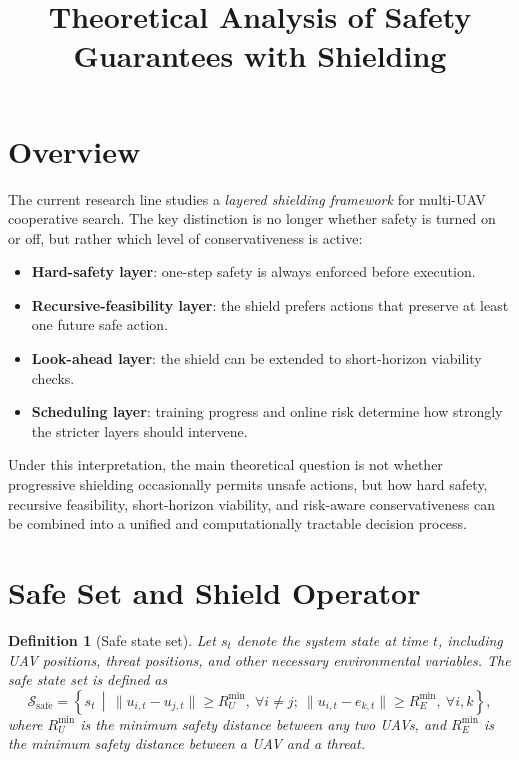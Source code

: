 \documentclass[11pt]{article}
\title{Theoretical Analysis of Safety Guarantees with Shielding}
\author{}
\date{}
\newtheorem{definition}{Definition}
\begin{document}
\maketitle

\section{Overview}

The current research line studies a \emph{layered shielding framework} for multi-UAV cooperative search. The key distinction is no longer whether safety is turned on or off, but rather which level of conservativeness is active:
\begin{itemize}[leftmargin=1.5em]
    \item \textbf{Hard-safety layer}: one-step safety is always enforced before execution.
    \item \textbf{Recursive-feasibility layer}: the shield prefers actions that preserve at least one future safe action.
    \item \textbf{Look-ahead layer}: the shield can be extended to short-horizon viability checks.
    \item \textbf{Scheduling layer}: training progress and online risk determine how strongly the stricter layers should intervene.
\end{itemize}

Under this interpretation, the main theoretical question is not whether progressive shielding occasionally permits unsafe actions, but how hard safety, recursive feasibility, short-horizon viability, and risk-aware conservativeness can be combined into a unified and computationally tractable decision process.

\section{Safe Set and Shield Operator}

\begin{definition}[Safe state set]
Let $s_t$ denote the system state at time $t$, including UAV positions, threat positions, and other necessary environmental variables. The safe state set is defined as
\begin{equation}
\mathcal S_{\mathrm{safe}}
=
\left\{
s_t \,\middle|\,
\|u_{i,t}-u_{j,t}\| \ge R_U^{\min},\ \forall i \neq j;\ 
\|u_{i,t}-e_{k,t}\| \ge R_E^{\min},\ \forall i,k
\right\},
\end{equation}
where $R_U^{\min}$ is the minimum safety distance between any two UAVs, and $R_E^{\min}$ is the minimum safety distance between a UAV and a threat.
\end{definition}
\end{document}
